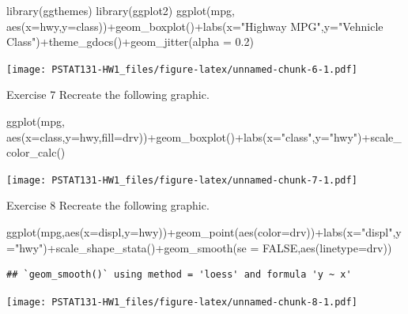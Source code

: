 \documentclass[
]{article}
\newenvironment{Shaded}{\begin{snugshade}}{\end{snugshade}}
\newcommand{\AttributeTok}[1]{\textcolor[rgb]{0.77,0.63,0.00}{#1}}
\newcommand{\ConstantTok}[1]{\textcolor[rgb]{0.00,0.00,0.00}{#1}}
\newcommand{\FloatTok}[1]{\textcolor[rgb]{0.00,0.00,0.81}{#1}}
\newcommand{\FunctionTok}[1]{\textcolor[rgb]{0.00,0.00,0.00}{#1}}
\newcommand{\NormalTok}[1]{#1}
\newcommand{\SpecialCharTok}[1]{\textcolor[rgb]{0.00,0.00,0.00}{#1}}
\newcommand{\StringTok}[1]{\textcolor[rgb]{0.31,0.60,0.02}{#1}}
\begin{document}
\begin{Shaded}
\begin{Highlighting}[]
\FunctionTok{library}\NormalTok{(ggthemes)}
\FunctionTok{library}\NormalTok{(ggplot2)}
\FunctionTok{ggplot}\NormalTok{(mpg, }\FunctionTok{aes}\NormalTok{(}\AttributeTok{x=}\NormalTok{hwy,}\AttributeTok{y=}\NormalTok{class))}\SpecialCharTok{+}\FunctionTok{geom\_boxplot}\NormalTok{()}\SpecialCharTok{+}\FunctionTok{labs}\NormalTok{(}\AttributeTok{x=}\StringTok{"Highway MPG"}\NormalTok{,}\AttributeTok{y=}\StringTok{"Vehnicle Class"}\NormalTok{)}\SpecialCharTok{+}\FunctionTok{theme\_gdocs}\NormalTok{()}\SpecialCharTok{+}\FunctionTok{geom\_jitter}\NormalTok{(}\AttributeTok{alpha =} \FloatTok{0.2}\NormalTok{) }
\end{Highlighting}
\end{Shaded}

\texttt{[image: PSTAT131-HW1\_files/figure-latex/unnamed-chunk-6-1.pdf]}

Exercise 7 Recreate the following graphic.

\begin{Shaded}
\begin{Highlighting}[]
\FunctionTok{ggplot}\NormalTok{(mpg, }\FunctionTok{aes}\NormalTok{(}\AttributeTok{x=}\NormalTok{class,}\AttributeTok{y=}\NormalTok{hwy,}\AttributeTok{fill=}\NormalTok{drv))}\SpecialCharTok{+}\FunctionTok{geom\_boxplot}\NormalTok{()}\SpecialCharTok{+}\FunctionTok{labs}\NormalTok{(}\AttributeTok{x=}\StringTok{"class"}\NormalTok{,}\AttributeTok{y=}\StringTok{"hwy"}\NormalTok{)}\SpecialCharTok{+}\FunctionTok{scale\_color\_calc}\NormalTok{()}
\end{Highlighting}
\end{Shaded}

\texttt{[image: PSTAT131-HW1\_files/figure-latex/unnamed-chunk-7-1.pdf]}

Exercise 8 Recreate the following graphic.

\begin{Shaded}
\begin{Highlighting}[]
\FunctionTok{ggplot}\NormalTok{(mpg,}\FunctionTok{aes}\NormalTok{(}\AttributeTok{x=}\NormalTok{displ,}\AttributeTok{y=}\NormalTok{hwy))}\SpecialCharTok{+}\FunctionTok{geom\_point}\NormalTok{(}\FunctionTok{aes}\NormalTok{(}\AttributeTok{color=}\NormalTok{drv))}\SpecialCharTok{+}\FunctionTok{labs}\NormalTok{(}\AttributeTok{x=}\StringTok{"displ"}\NormalTok{,}\AttributeTok{y=}\StringTok{"hwy"}\NormalTok{)}\SpecialCharTok{+}\FunctionTok{scale\_shape\_stata}\NormalTok{()}\SpecialCharTok{+}\FunctionTok{geom\_smooth}\NormalTok{(}\AttributeTok{se =} \ConstantTok{FALSE}\NormalTok{,}\FunctionTok{aes}\NormalTok{(}\AttributeTok{linetype=}\NormalTok{drv))}
\end{Highlighting}
\end{Shaded}

\begin{verbatim}
## `geom_smooth()` using method = 'loess' and formula 'y ~ x'
\end{verbatim}

\texttt{[image: PSTAT131-HW1\_files/figure-latex/unnamed-chunk-8-1.pdf]}
\end{document}
